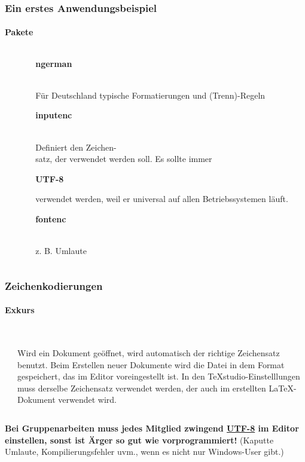 \begin{frame}
\frametitle{Ein erstes Anwendungsbeispiel}
\framesubtitle{Pakete}
\begin{columns}
\begin{column}{0.55\textwidth}
\begin{ttfamily}\footnotesize

 \normalsize
\end{ttfamily}
\end{column}
\begin{column}{0.45\textwidth}
\begin{ttfamily}\textbf{ngerman}\end{ttfamily}\\
Für Deutschland typische Formatierungen und (Trenn)-Regeln\\[5mm]

\begin{ttfamily}\textbf{inputenc}\end{ttfamily}\\
Definiert den Zeichen-\\satz, der verwendet werden soll. Es sollte immer
\begin{ttfamily}\textbf{UTF-8}\end{ttfamily} verwendet werden, weil er universal auf
allen Betriebssystemen läuft.\\[5mm]

\begin{ttfamily}\textbf{fontenc}\end{ttfamily}\\
z. B. Umlaute\\
\end{column}
\end{columns}
\end{frame}


\begin{frame}
\frametitle{Zeichenkodierungen}
\framesubtitle{Exkurs}
\begin{columns}
\begin{column}{0.6\textwidth}

\end{column}
\begin{column}{0.4\textwidth}
\vspace*{2pt}\\
Wird ein Dokument geöffnet, wird automatisch der richtige Zeichensatz benutzt.
Beim Erstellen neuer Dokumente wird die Datei in dem Format gespeichert, das im
 Editor voreingestellt ist. In den TeXstudio-Einstelllungen muss derselbe Zeichensatz verwendet werden, der
auch im erstellten \LaTeX -Dokument verwendet wird.\\
\end{column}
\end{columns}
\vspace*{4pt}
\textbf{Bei Gruppenarbeiten muss jedes Mitglied zwingend \underline{UTF-8} im
Editor einstellen, sonst ist Ärger so gut wie vorprogrammiert!} (Kaputte
Umlaute, Kompilierungsfehler uvm., wenn es nicht nur Windows-User gibt.)
\end{frame}

